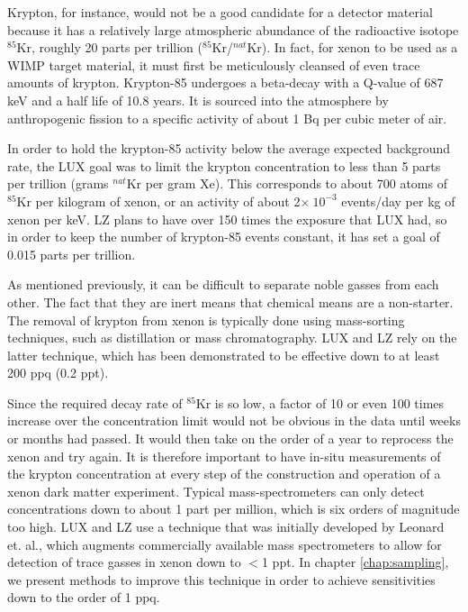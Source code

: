 Krypton, for instance, would not be a good candidate for a detector material because it has a relatively large atmospheric abundance of the radioactive isotope $^{85}$Kr, roughly 20 parts per trillion ($^{85}$Kr/$^{nat}$Kr). In fact, for xenon to be used as a WIMP target material, it must first be meticulously cleansed of even trace amounts of krypton. Krypton-85 undergoes a beta-decay with a Q-value of 687 keV and a half life of 10.8 years. It is sourced into the atmosphere by anthropogenic fission to a specific activity of about 1 Bq per cubic meter of air. 

In order to hold the krypton-85 activity below the average expected background rate, the LUX goal was to limit the krypton concentration to less than 5 parts per trillion (grams $^{nat}$Kr per gram Xe). This corresponds to about 700 atoms of $^{85}$Kr per kilogram of xenon, or an activity of about 2$\times \ 10^{-3}$ events/day per kg of xenon per keV. LZ plans to have over 150 times the exposure that LUX had, so in order to keep the number of krypton-85 events constant, it has set a goal of 0.015 parts per trillion\cite{lz_tdr}. 

As mentioned previously, it can be difficult to separate noble gasses from each other. The fact that they are inert means that chemical means are a non-starter. The removal of krypton from xenon is typically done using mass-sorting techniques, such as distillation or mass chromatography. LUX and LZ rely on the latter technique, which has been demonstrated to be effective down to at least 200 ppq (0.2 ppt)\cite{lz_tdr,lux_krremoval}.

Since the required decay rate of $^{85}$Kr is so low, a factor of 10 or even 100 times increase over the concentration limit would not be obvious in the data until weeks or months had passed. It would then take on the order of a year to reprocess the xenon and try again. It is therefore important to have in-situ measurements of the krypton concentration at every step of the construction and operation of a xenon dark matter experiment. Typical mass-spectrometers can only detect concentrations down to about 1 part per million, which is six orders of magnitude too high. LUX and LZ use a technique that was initially developed by Leonard et. al., which augments commercially available mass spectrometers to allow for detection of trace gasses in xenon down to $<$1 ppt\cite{sampling_doug}. In chapter \ref{chap:sampling}, we present methods to improve this technique in order to achieve sensitivities down to the order of 1 ppq. 

